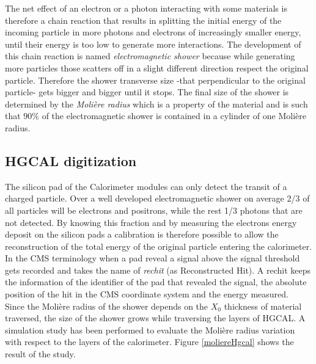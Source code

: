 The net effect of an electron or a photon interacting with some materials is therefore a chain reaction that results in splitting the initial energy of the incoming particle in more photons and electrons of increasingly smaller energy, until their energy is too low to generate more interactions.
The development of this chain reaction is named \textit{electromagnetic shower} because while generating more particles those scatters off in a slight different direction respect the original particle. Therefore the shower transverse size -that perpendicular to the original particle- gets bigger and bigger until it stops. The final size of the shower is determined by the \textit{Molière radius} which is a property of the material and is such that $90\%$ of the electromagnetic shower is contained in a cylinder of one Molière radius.

\subsection{HGCAL digitization}
The silicon pad of the Calorimeter modules can only detect the transit of a charged particle. Over a well developed electromagnetic shower on average 2/3 of all particles will be electrons and positrons, while the rest 1/3 photons that are not detected. By knowing this fraction and by measuring the electrons energy deposit on the silicon pads a calibration is therefore possible to allow the reconstruction of the total energy of the original particle entering the calorimeter.\\
In the CMS terminology when a pad reveal a signal above the signal threshold gets recorded and takes the name of \textit{rechit} (as Reconstructed Hit). A rechit keeps the information of the identifier of the pad that revealed the signal, the absolute position of the hit in the CMS coordinate system and the energy measured.\\
Since the Molière radius of the shower depends on the $X_0$ thickness of material traversed, the size of the shower grows while traversing the layers of HGCAL. A simulation study has been performed to evaluate the Molière radius variation with respect to the layers of the calorimeter. Figure \ref{moliereHgcal} shows the result of the study.\\

